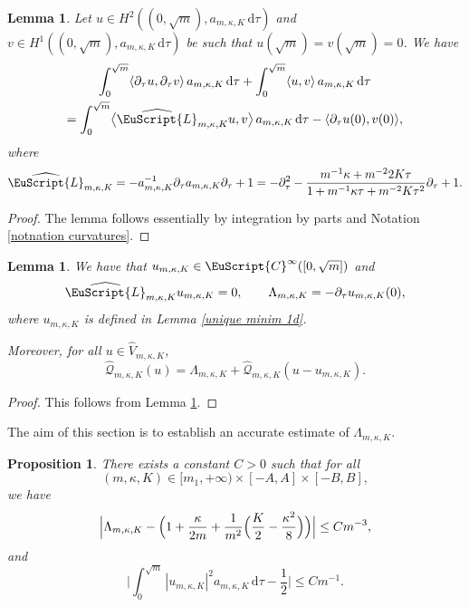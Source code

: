 \documentclass[JEP,XML,SOM,Unicode]{cedram}
\let\mathcal \EuScript
\newcommand{\scrQ}{\mathscr{Q}}
\newcommand{\cC}{\mathcal{C}}
\newcommand{\cL}{\mathcal{L}}
\theoremstyle{plain}
\newtheorem{lemma}[theorem]{Lemma}
\newtheorem{proposition}[theorem]{Proposition}
\theoremstyle{definition}
\newcommand{\dx}{\mathrm{\,d}}
\let\pa\partial
\begin{document}
\begin{lemma}\label{lem.ipp1D}
Let $u\in H^2((0,\sqrt{m}), a_{m,\kappa,K}\dx\tau)$ and $v\in H^1((0,\sqrt{m}), a_{m,\kappa,K}\dx\tau)$ {} be such that $u(\sqrt{m}) = v(\sqrt{m})= 0$. We have
\begin{multline}\label{eq:IPPno}
\int_0^{\sqrt{m}}\langle
\pa_\tau u,\pa_\tau v
\rangle\, a_{m,\kappa,K}\dx\tau
+
\int_0^{\sqrt{m}}\langle
u,v
\rangle\, a_{m,\kappa,K}\dx\tau
\\
=
\int_0^{\sqrt{m}}\bigl\langle
\widehat{\cL}_{m,\kappa,K} u,v
\bigr\rangle\, a_{m,\kappa,K}\dx\tau
-\langle\pa_\tau u(0),v(0)\rangle,
\end{multline}
where
\[
\widehat{\cL}_{m,\kappa,K} =- a^{-1}_{m,\kappa,K}\partial_\tau a_{m,\kappa,K}\partial_\tau
+1= -\pa^2_\tau - \frac{m^{-1}\kappa + m^{-2}2K\tau}{1 + m^{-1}\kappa\tau + m^{-2}K\tau^{2}}\pa_\tau + 1.
\]
\end{lemma}
\begin{proof}
The lemma follows essentially by integration by parts and Notation \ref{notnation curvatures}.
\end{proof}
\begin{lemma}\label{lem.EL1D}
We have that $u_{m,\kappa,K}\in \cC^\infty([0,\sqrt{m}])$ and
\[\widehat{\cL}_{m,\kappa,K} u_{m,\kappa,K} = 0,\qquad \Lambda_{m,\kappa,K}=-\pa_\tau u_{m,\kappa,K} (0),\]
where $u_{m,\kappa,K}$ is defined in Lemma \ref{unique minim 1d}.

Moreover, for all $u\in \widehat{V}_{m,\kappa,K}$,
\[\widehat{\scrQ}_{m,\kappa,K}(u) = \Lambda_{m,\kappa,K}+\widehat{\scrQ}_{m,\kappa,K}(u-u_{m,\kappa,K}).\]
\end{lemma}

\begin{proof}
This follows from Lemma \ref{lem.ipp1D}.
\end{proof}

The aim of this section is to establish an accurate estimate of $\Lambda_{m,\kappa,K}$.
\begin{proposition}\label{lem:ext}
There exists a constant $C>0$ such that for all
\[
(m,\kappa,K)\in[m_1,+\infty)\times[-A,A]\times [-B,B],
\]
we have
\[\Bigl|\Lambda_{m,\kappa,K} - \Bigl(1 + \frac{\kappa}{2m} + \frac{1}{m^2}\Bigl(\frac{K}{2}-\frac{\kappa^2}{8}\Bigr)\Bigr)\Bigr|\leq Cm^{-3},\]
and
\[\biggl|\int_0^{\sqrt{m}}|u_{m,\kappa,K}|^2a_{m,\kappa,K}\dx \tau - \frac{1}{2}\biggr| \leq Cm^{-1}.\]
\end{proposition}
\end{document}
